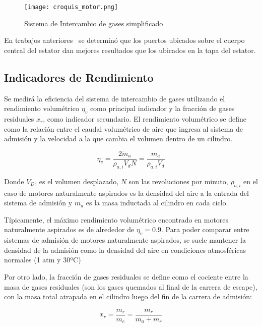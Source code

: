 \begin{figure}
    \centering
    \texttt{[image: croquis\_motor.png]}
    \caption{Sistema de Intercambio de gases simplificado}\label{fig:croquis_mrcvc}
\end{figure}

En trabajos anteriores~\parencite{mrcvc_geom} se determinó que los puertos
ubicados sobre el cuerpo central del estator  dan mejores resultados que los
ubicados en la tapa del estator.

\subsection{Indicadores de Rendimiento}\label{sec:indicadores_rendimiento}

Se medirá la eficiencia del sistema de intercambio de gases utilizando el
rendimiento volumétrico $\eta_v$ como principal indicador y la fracción de
gases residuales $x_r$, como indicador secundario.
%
El rendimiento volumétrico se define como la relación entre el caudal
volumétrico de aire que ingresa al sistema de admisión y la velocidad a la que
cambia el volumen dentro de un cilindro.
%

\begin{equation}\label{eq:rendVol}
  \eta_v = \frac{2 \dot{m}_a}{\rho_{a,i} V_d N} = \frac{m_a}{\rho_{a,i} V_d}
\end{equation}

Donde $V_D$, es el volumen desplazado, $N$ son las revoluciones por minuto,
$\rho_{a,i}$ en el caso de motores naturalmente aspirados es la densidad del
aire a la entrada del sistema de admisión y $m_a$ es la masa inductada al
cilindro en cada ciclo.

Típicamente, el máximo rendimiento volumétrico encontrado en motores
naturalmente aspirados es de alrededor de $\eta_v = 0.9$.
%
Para poder comparar entre sistemas de admisión de motores naturalmente
aspirados, se suele mantener la densidad de la admisión como la densidad del
aire en condiciones atmosféricas normales (1 atm y 30ºC) 

Por otro lado, la fracción de gases residuales se define como el cociente entre
la masa de gases residuales (son los gases quemados al final de la carrera de
escape), con la masa total atrapada en el cilindro luego del fin de la carrera
de admisión:

\begin{equation}\label{eq:fracRes}
    x_r = \frac{m_r}{m_c} = \frac{m_r}{m_a + m_r} 
\end{equation}

